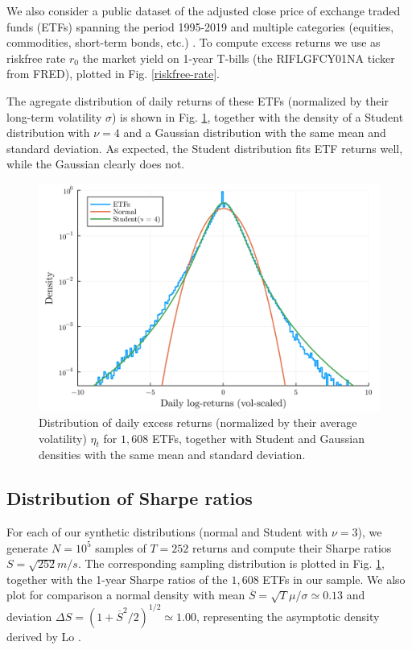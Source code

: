 \documentclass[
reprint,
amsmath,amssymb,
aps,
]{revtex4-2}
\begin{document}
We also consider a public dataset of the adjusted close price of exchange traded funds (ETFs) spanning the period 1995-2019 and multiple categories (equities, commodities, short-term bonds, etc.) \cite{leoneUS}. 
To compute excess returns we use as riskfree rate $r_0$ the market yield on 1-year T-bills (the RIFLGFCY01NA ticker from FRED), plotted in Fig. \ref{riskfree-rate}. 

The agregate distribution of daily returns of these ETFs (normalized by their long-term volatility $\sigma$) is shown in Fig. \ref{returns-dist}, together with the density of a Student distribution with $\nu =4$ and a Gaussian distribution with the same mean and standard deviation. 
As expected, the Student distribution fits ETF returns well, while the Gaussian clearly does not. 

\begin{figure}[t!]
    \includegraphics[width = .45\textwidth]{returns-vol-scaled-dist.png}
    \caption{Distribution of daily excess returns (normalized by their average volatility) $\eta_t$ for $1,608$ ETFs, together with Student and Gaussian densities with the same mean and standard deviation.}
    \label{returns-dist}
\end{figure}

\subsection{Distribution of Sharpe ratios}

For each of our synthetic distributions (normal and Student with $\nu =3$), we generate $N = 10^5$ samples of $T = 252$ returns and compute their Sharpe ratios $S=\sqrt{252}m/s$. 
The corresponding sampling distribution is plotted in Fig. \ref{returns-dist}, together with the 1-year Sharpe ratios of the $1,608$ ETFs in our sample. 
We also plot for comparison a normal density with mean $\overline{S} = \sqrt{T}\mu/\sigma\simeq 0.13$ and deviation $\Delta S = (1+\overline{S}^2/2)^{1/2}\simeq 1.00$, representing the asymptotic density derived by Lo \cite{loStatistics2002}. 
\end{document}
